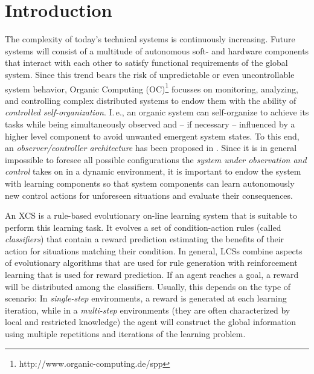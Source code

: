 \section{Introduction}
\label{section:introduction}

The complexity of today's technical systems is continuously increasing. Future systems will consist of a multitude of autonomous soft- and hardware components that interact with each other to satisfy functional requirements of the global system. Since this trend bears the risk of unpredictable or even uncontrollable system behavior, Organic Computing (OC)\footnote{http://www.organic-computing.de/spp} %
focusses on monitoring, analyzing, and controlling complex distributed systems to endow them with the ability of \emph{controlled self-organization}. I.\,e., an or\-ga\-nic system can self-organize to achieve its tasks while being simultaneously observed and -- if necessary -- influenced by a higher level component to avoid unwanted emergent system states. To this end, an \emph{observer/controller architecture} has been proposed in \cite{RMB+06}. %
Since it is in general impossible to foresee all possible configurations the \emph{system under observation and control} takes on in a dynamic environment, it is important to endow the system with learning components so that system components can learn autonomously new control actions for unforeseen situations and evaluate their consequences.

An XCS \cite{Wil95} is a rule-based evolutionary on-line learning system that is suitable to perform this learning task. It evolves a set of condition-action rules (called \emph{classifiers}) that contain a reward prediction estimating the benefits of their action for situations matching their condition. In general, LCSs combine aspects of evolutionary algorithms that are used for rule generation with reinforcement learning that is used for reward prediction. If an agent reaches a goal, a reward will be distributed among the classifiers. Usually,  this depends on the type of scenario: In \emph{single-step} environments, a reward is generated at each learning iteration, while in a \emph{multi-step} environments (they are often characterized by local and restricted knowledge) the agent will construct the global information using multiple repetitions and iterations of the learning problem.

